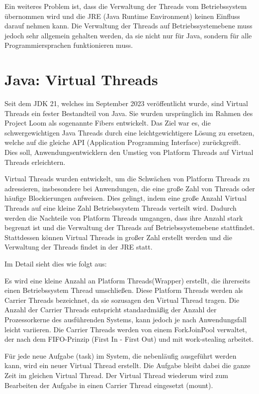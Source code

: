 \documentclass[fontsize=12pt,paper=a4,twoside=semi,parskip=half-,headsepline,headinclude]{scrreprt}
\begin{document}
Ein weiteres Problem ist, dass die Verwaltung der Threads vom Betriebssystem über\-nommen wird und die JRE (Java Runtime Environment) keinen Einfluss darauf nehmen kann. Die Verwaltung der Threads auf Betriebssystemebene muss jedoch sehr allgemein gehalten werden, da sie nicht nur für Java, sondern für alle Programmiersprachen funktionieren muss.

\section{Java: Virtual Threads}

Seit dem JDK 21, welches im September 2023 veröffentlicht wurde, sind Virtual Threads ein fester Bestandteil von Java. Sie wurden ursprünglich im Rahmen des Project Loom \cite{loom2024} als sogenannte Fibers entwickelt. Das Ziel war es, die schwergewichtigen Java Threads durch eine leichtgewichtigere Lösung zu ersetzen, welche auf die gleiche API (Application Programming Interface) zurückgreift. Dies soll, Anwendungsentwicklern den Umstieg von Platform Threads auf Virtual Threads erleichtern.

Virtual Threads wurden entwickelt, um die Schwächen von Platform Threads zu adressieren, insbesondere bei Anwendungen, die eine große Zahl von Threads oder häufige Blockierungen aufweisen. Dies gelingt, indem eine große Anzahl Virtual Threads auf eine kleine Zahl Betriebssystem Threads verteilt wird. Dadurch werden die Nachteile von Platform Threads umgangen, dass ihre Anzahl stark begrenzt ist und die Verwaltung der Threads auf Betriebssystemebene stattfindet. Stattdessen können Virtual Threads in großer Zahl erstellt werden und die Verwaltung der Threads findet in der JRE statt.

Im Detail sieht dies wie folgt aus:

Es wird eine kleine Anzahl an Platform Threads(Wrapper) erstellt, die ihrerseits einen Betriebssystem Thread umschließen. Diese Platform Threads werden als Carrier Threads bezeichnet, da sie sozusagen den Virtual Thread tragen. Die Anzahl der Carrier Threads entspricht standardmäßig der Anzahl der Prozessorkerne des ausführenden Systems, kann jedoch je nach Anwendungsfall leicht variieren. Die Carrier Threads werden von einem ForkJoinPool verwaltet, der nach dem FIFO-Prinzip (First In - First Out) und mit work-stealing arbeitet.\cite{Pressler2023a}

Für jede neue Aufgabe (task) im System, die nebenläufig ausgeführt werden kann, wird ein neuer Virtual Thread erstellt. Die Aufgabe bleibt dabei die ganze Zeit im gleichen Virtual Thread. Der Virtual Thread wiederum wird zum Bearbeiten der Aufgabe in einen Carrier Thread eingesetzt (mount). 
\end{document}
